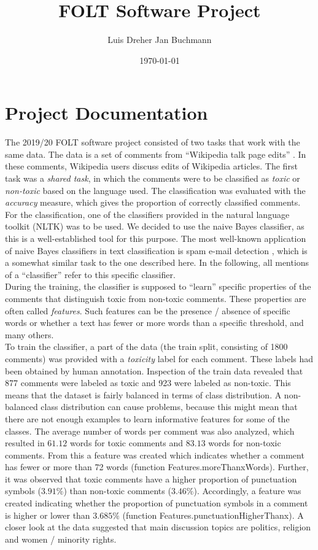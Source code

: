 \documentclass[11pt,a4paper]{article}
\title{FOLT Software Project}
\author{Luis Dreher \And Jan Buchmann}
\date{\today}
\begin{document}
\maketitle


\section{Project Documentation}
The 2019/20 FOLT software project consisted of two tasks that work with the same data. The data is a set of comments from ``Wikipedia talk page edits'' \cite{taskdescription}. In these comments, Wikipedia users discuss edits of Wikipedia articles. The first task was a \textit{shared task}, in which the comments were to be classified as \textit{toxic} or \textit{non-toxic} based on the language used. The classification was evaluated with the \textit{accuracy} measure, which gives the proportion of correctly classified comments. \\
For the classification, one of the classifiers provided in the natural language toolkit (NLTK) \citep{nltkbook} was to be used. We decided to use the naive Bayes classifier, as this is a well-established tool for this purpose.  The most well-known application of naive Bayes classifiers in text classification is spam e-mail detection \cite{naivebayesspam}, which is a somewhat similar task to the one described here. In the following, all mentions of a ``classifier'' refer to this specific classifier. \\
During the training, the classifier is supposed to ``learn'' specific properties of the comments that distinguish toxic from non-toxic comments. These properties are often called \textit{features}. Such features can be the presence / absence of specific words or whether a text has fewer or more words than a specific threshold, and many others. \\
To train the classifier, a part of the data (the train split, consisting of 1800 comments) was provided with a \textit{toxicity} label for each comment. These labels had been obtained by human annotation. Inspection of the train data revealed that 877 comments were labeled as toxic and 923 were labeled as non-toxic. This means that the dataset is fairly balanced in terms of class distribution. A non-balanced class distribution can cause problems, because this might mean that there are not enough examples to learn informative features for some of the classes. The average number of words per comment was also analyzed, which resulted in $61.12$ words for toxic comments and $83.13$ words for non-toxic comments. From this a feature was created which indicates whether a comment has fewer or more than 72 words (function Features.moreThanxWords). Further, it was observed that toxic comments have a higher proportion of punctuation symbols ($3.91\%$) than non-toxic comments ($3.46\%$). Accordingly, a feature was created indicating whether the proportion of punctuation symbols in a comment is higher or lower than $3.685\%$ (function Features.punctuationHigherThanx). A closer look at the data suggested that main discussion topics are politics, religion and women / minority rights. \\
\end{document}
